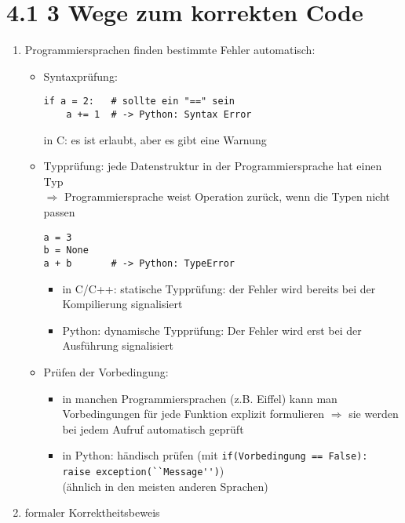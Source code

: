 \section*{4.1 3 Wege zum korrekten Code}
    \begin{enumerate}
        \item Programmiersprachen finden bestimmte Fehler automatisch:
        \begin{itemize}
            \item Syntaxprüfung:
            \begin{verbatim}
if a = 2:   # sollte ein "==" sein
    a += 1  # -> Python: Syntax Error
            \end{verbatim}
            in C: es ist erlaubt, aber es gibt eine Warnung
            \item Typprüfung: jede Datenstruktur in der Programmiersprache hat einen Typ \\
            $\Rightarrow$ Programmiersprache weist Operation zurück, wenn die Typen nicht passen
            \begin{verbatim}
a = 3
b = None
a + b       # -> Python: TypeError
            \end{verbatim}
            \begin{itemize}
                \item in C/C++: statische Typprüfung: der Fehler wird bereits bei der Kompilierung signalisiert
                \item Python: dynamische Typprüfung: Der Fehler wird erst bei der Ausführung signalisiert
            \end{itemize}
            \item Prüfen der Vorbedingung:
            \begin{itemize}
                \item in manchen Programmiersprachen (z.B. Eiffel) kann man Vorbedingungen für jede Funktion explizit formulieren $\Rightarrow$ sie werden bei jedem Aufruf automatisch geprüft
                \item in Python: händisch prüfen (mit \verb|if(Vorbedingung == False): |\\ \verb|raise exception(``Message'')|)\\
                (ähnlich in den meisten anderen Sprachen)
            \end{itemize}
        \end{itemize}
        \item formaler Korrektheitsbeweis \\

\end{enumerate}
